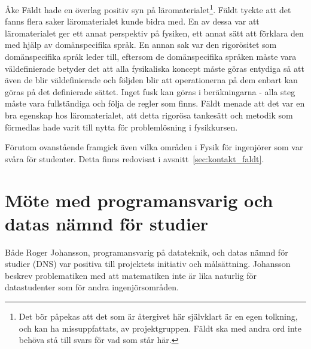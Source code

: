 Åke Fäldt hade en överlag positiv syn på läromaterialet\footnote{Det bör
påpekas att det som är återgivet här självklart är en egen tolkning, och kan ha
missuppfattats, av projektgruppen. Fäldt ska med andra ord inte behöva stå till
svars för vad som står här.}. Fäldt tyckte att det fanns flera saker
läromaterialet kunde bidra med. En av dessa var att läromaterialet ger ett annat
perspektiv på fysiken, ett annat sätt att förklara den med
hjälp av domänspecifika språk. En annan sak var den rigorösitet som
domänspecifika språk leder till, eftersom de domänspecifika språken måste vara
väldefinierade betyder det att alla fysikaliska koncept måste göras entydiga så
att även de blir väldefinierade och följden blir att operationerna på dem
enbart kan göras på det definierade sättet. Inget fusk kan göras i
beräkningarna - alla steg måste vara fullständiga och följa de regler som finns.
Fäldt menade att det var en bra egenskap hos läromaterialet, att detta rigorösa
tankesätt och metodik som förmedlas hade varit till nytta för problemlösning i
fysikkursen.

Förutom ovanstående framgick även vilka områden i Fysik för ingenjörer som var
svåra för studenter. Detta finns redovisat i avsnitt~\ref{sec:kontakt_faldt}.

\section{Möte med programansvarig och datas nämnd för studier}

Både Roger Johansson, programansvarig på datateknik, och datas nämnd för studier (DNS)
var positiva till projektets initiativ och målsättning. Johansson beskrev
problematiken med att matematiken inte är lika naturlig för datastudenter som för
andra ingenjörsområden.
